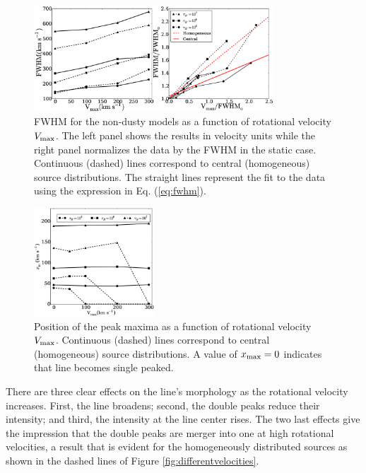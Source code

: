 \documentclass{emulateapj}
\begin{document}
\begin{figure}
\begin{center}
  \includegraphics[width=0.8\textwidth]{f2.eps}
\end{center}
  \caption{FWHM for the non-dusty models as a function of
    rotational velocity $V_{\rm max}$. The left panel shows the
    results in velocity units while the right panel normalizes
    the data by the FWHM in the static case. 
    Continuous (dashed) lines  correspond to central (homogeneous)
    source distributions. The straight lines represent the fit to
    the data using the expression in Eq. (\ref{eq:fwhm}).
    \label{fig:widthvsvelocity}} 
\end{figure}


\begin{figure}
\begin{center}
  \includegraphics[width=0.40\textwidth]{f3.eps}
\end{center}
\caption{Position of the peak maxima as a function of rotational
  velocity $V_{\rm max}$. Continuous (dashed) lines correspond to
  central (homogeneous) source distributions. A value of $x_{\rm
    max}=0$ indicates that line becomes single
  peaked. \label{fig:maximumsvsvelocity}}  
\end{figure}

There are three clear effects on the line's morphology as the
rotational velocity increases. First, the line
broadens; second, the double peaks reduce their intensity; and third,
the intensity at the line center rises. The two last effects give the
impression that the double peaks are merger into one at high rotational
velocities, a result that is evident for the homogeneously distributed
sources as shown in the dashed lines of Figure \ref{fig:differentvelocities}.
\end{document}
